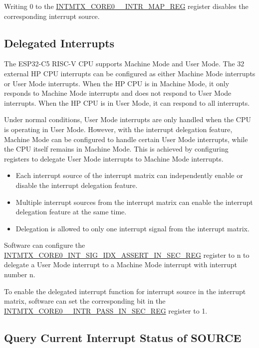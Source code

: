 \documentclass[main\_\_EN.tex]{subfiles}
\begin{document}
Writing 0 to the \hyperref[INTMTXCORE0SOURCEINTRMAPREG]{INTMTX\_CORE0\_\_INTR\_MAP\_REG} register disables the corresponding interrupt source.


\subsection{Delegated Interrupts}

The ESP32-C5 RISC-V CPU supports Machine Mode and User Mode. The 32 external HP CPU interrupts can be configured as either Machine Mode interrupts or User Mode interrupts. When the HP CPU is in Machine Mode, it only responds to Machine Mode interrupts and does not respond to User Mode interrupts. When the HP CPU is in User Mode, it can respond to all interrupts.

Under normal conditions, User Mode interrupts are only handled when the CPU is operating in User Mode. However, with the interrupt delegation feature, Machine Mode can be configured to handle certain User Mode interrupts, while the CPU itself remains in Machine Mode. This is achieved by configuring registers to delegate User Mode interrupts to Machine Mode interrupts.

\begin{itemize}
\item Each interrupt source of the interrupt matrix can independently enable or disable the interrupt delegation feature.
\item Multiple interrupt sources from the interrupt matrix can enable the interrupt delegation feature at the same time.
\item Delegation is allowed to only one interrupt signal from the interrupt matrix.
\end{itemize}

Software can configure the \hyperref[regdesc:INTMTXCORE0INTSIGIDXASSERTINSECREG]{INTMTX\_CORE0\_INT\_SIG\_IDX\_ASSERT\_IN\_SEC\_REG} register to n to delegate a User Mode interrupt to a Machine Mode interrupt with interrupt number n.

To enable the delegated interrupt function for interrupt source  in the interrupt matrix, software can set the corresponding bit in the \hyperref[INTMTXCORE0SOURCEINTRMAPREG]{INTMTX\_CORE0\_\_INTR\_PASS\_IN\_SEC\_REG} register to 1.

\subsection{Query Current Interrupt Status of SOURCE}
\end{document}

